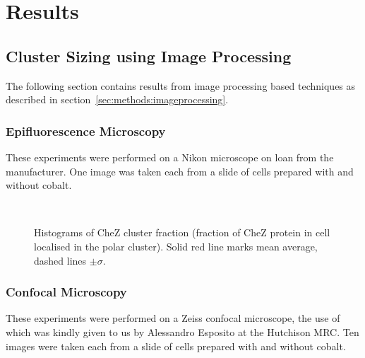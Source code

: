 \documentclass[../main.tex]{subfiles}
\begin{document}
\section{Results}

\subsection{Cluster Sizing using Image Processing}

The following section contains results from image processing based techniques as described in section~\ref{sec:methods:imageprocessing}.

\subsubsection{Epifluorescence Microscopy}

These experiments were performed on a Nikon microscope on loan from the manufacturer. One image was taken each from a slide of cells prepared with and without cobalt.

\begin{figure}[h!]
\begin{center}
\\
\caption{Histograms of CheZ cluster fraction (fraction of CheZ protein in cell localised in the polar cluster). Solid red line marks mean average, dashed lines \(\pm\sigma\).}
\label{fig:results:nikon}
\end{center}
\end{figure}

\subsubsection{Confocal Microscopy}

These experiments were performed on a Zeiss confocal microscope, the use of which was kindly given to us by Alessandro Esposito at the Hutchison MRC. Ten images were taken each from a slide of cells prepared with and without cobalt.
\end{document}
